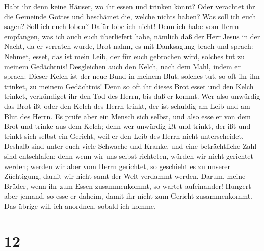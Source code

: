 Habt ihr denn keine Häuser, wo ihr essen und trinken könnt? Oder
verachtet ihr die Gemeinde Gottes und beschämet die, welche nichts
haben? Was soll ich euch sagen? Soll ich euch loben? Dafür lobe ich
nicht!  Denn ich habe vom Herrn empfangen, was ich auch
euch überliefert habe, nämlich daß der Herr Jesus in der Nacht, da er
verraten wurde, Brot nahm, es mit Danksagung brach und sprach:
 Nehmet, esset, das ist mein Leib, der für euch gebrochen
wird, solches tut zu meinem Gedächtnis!  Desgleichen auch
den Kelch, nach dem Mahl, indem er sprach: Dieser Kelch ist der neue
Bund in meinem Blut; solches tut, so oft ihr ihn trinket, zu meinem
Gedächtnis!  Denn so oft ihr dieses Brot esset und den
Kelch trinket, verkündiget ihr den Tod des Herrn, bis daß er kommt.
 Wer also unwürdig das Brot ißt oder den Kelch des Herrn
trinkt, der ist schuldig am Leib und am Blut des Herrn. 
Es prüfe aber ein Mensch sich selbst, und also esse er von dem Brot und
trinke aus dem Kelch;  denn wer unwürdig ißt und trinkt,
der ißt und trinkt sich selbst ein Gericht, weil er den Leib des Herrn
nicht unterscheidet.  Deshalb sind unter euch viele
Schwache und Kranke, und eine beträchtliche Zahl sind entschlafen;
 denn wenn wir uns selbst richteten, würden wir nicht
gerichtet werden;  werden wir aber vom Herrn gerichtet,
so geschieht es zu unserer Züchtigung, damit wir nicht samt der Welt
verdammt werden.  Darum, meine Brüder, wenn ihr zum Essen
zusammenkommt, so wartet aufeinander!  Hungert aber
jemand, so esse er daheim, damit ihr nicht zum Gericht zusammenkommt.
Das übrige will ich anordnen, sobald ich komme.

\hypertarget{section-11}{%
\section{12}\label{section-11}}

